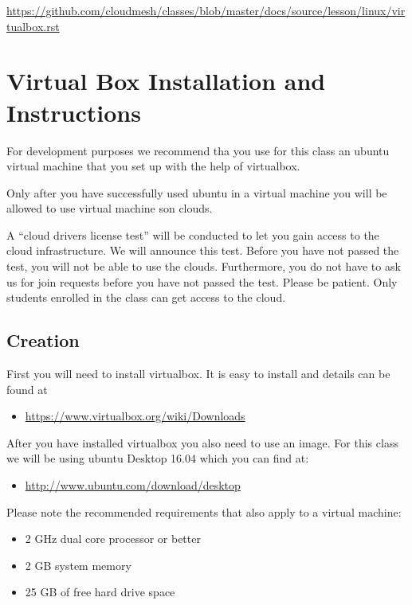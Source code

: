 \begin{fileremark}\url{https://github.com/cloudmesh/classes/blob/master/docs/source/lesson/linux/virtualbox.rst}\end{fileremark}
\section{Virtual Box Installation and
Instructions}\label{virtual-box-installation-and-instructions}

For development purposes we recommend tha you use for this class an
ubuntu virtual machine that you set up with the help of virtualbox.

Only after you have successfully used ubuntu in a virtual machine you
will be allowed to use virtual machine son clouds.

A ``cloud drivers license test'' will be conducted to let you gain
access to the cloud infrastructure. We will announce this test. Before
you have not passed the test, you will not be able to use the clouds.
Furthermore, you do not have to ask us for join requests before you have
not passed the test. Please be patient. Only students enrolled in the
class can get access to the cloud.

\subsection{Creation}\label{creation}

First you will need to install virtualbox. It is easy to install and
details can be found at

\begin{itemize}
\tightlist
\item
  \url{https://www.virtualbox.org/wiki/Downloads}
\end{itemize}

After you have installed virtualbox you also need to use an image. For
this class we will be using ubuntu Desktop 16.04 which you can find at:

\begin{itemize}
\tightlist
\item
  \url{http://www.ubuntu.com/download/desktop}
\end{itemize}

Please note the recommended requirements that also apply to a virtual
machine:

\begin{itemize}
\tightlist
\item
  2 GHz dual core processor or better
\item
  2 GB system memory
\item
  25 GB of free hard drive space
\end{itemize}

